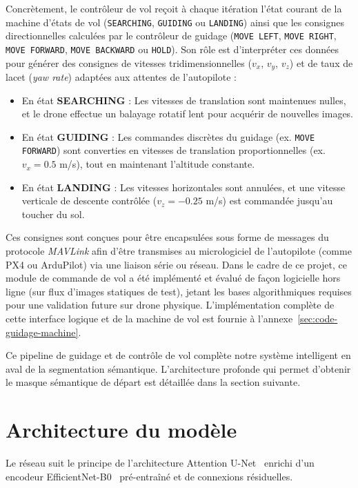 Concrètement, le contrôleur de vol reçoit à chaque itération l'état courant de la machine d'états de vol (\texttt{SEARCHING}, \texttt{GUIDING} ou \texttt{LANDING}) ainsi que les consignes directionnelles calculées par le contrôleur de guidage (\texttt{MOVE LEFT}, \texttt{MOVE RIGHT}, \texttt{MOVE FORWARD}, \texttt{MOVE BACKWARD} ou \texttt{HOLD}). Son rôle est d'interpréter ces données pour générer des consignes de vitesses tridimensionnelles ($v_x$, $v_y$, $v_z$) et de taux de lacet (\textit{yaw rate}) adaptées aux attentes de l'autopilote :
\begin{itemize}[leftmargin=1.8em, itemsep=4pt]
  \item En état \textbf{SEARCHING} : Les vitesses de translation sont maintenues nulles, et le drone effectue un balayage rotatif lent pour acquérir de nouvelles images.
  \item En état \textbf{GUIDING} : Les commandes discrètes du guidage (ex. \texttt{MOVE FORWARD}) sont converties en vitesses de translation proportionnelles (ex. $v_x = 0.5$ m/s), tout en maintenant l'altitude constante.
  \item En état \textbf{LANDING} : Les vitesses horizontales sont annulées, et une vitesse verticale de descente contrôlée ($v_z = -0.25$ m/s) est commandée jusqu'au toucher du sol.
\end{itemize}

Ces consignes sont conçues pour être encapsulées sous forme de messages du protocole \textit{MAVLink} afin d'être transmises au micrologiciel de l'autopilote (comme PX4 ou ArduPilot) via une liaison série ou réseau. Dans le cadre de ce projet, ce module de commande de vol a été implémenté et évalué de façon logicielle hors ligne (sur flux d'images statiques de test), jetant les bases algorithmiques requises pour une validation future sur drone physique. L'implémentation complète de cette interface logique et de la machine de vol est fournie à l'annexe~\ref{sec:code-guidage-machine}.

Ce pipeline de guidage et de contrôle de vol complète notre système intelligent en aval de la segmentation sémantique. L'architecture profonde qui permet d'obtenir le masque sémantique de départ est détaillée dans la section suivante.

\section{Architecture du modèle}
\label{sec:architecture-modele}

Le réseau suit le principe de l'architecture Attention U-Net~\cite{oktay2018attention} enrichi d'un encodeur EfficientNet-B0~\cite{tan2019efficientnet} pré-entraîné et de connexions résiduelles.


